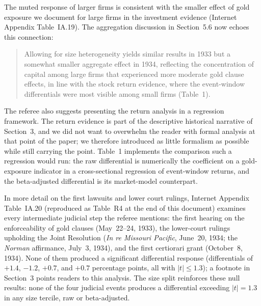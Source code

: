 \medskip
\noindent The muted response of larger firms is consistent with the smaller effect of gold exposure we document for large firms in the investment evidence (Internet Appendix Table~IA.19). The aggregation discussion in Section~5.6 now echoes this connection:

\begin{quote}
Allowing for size heterogeneity yields similar results in 1933 but a somewhat smaller aggregate effect in 1934, reflecting the concentration of capital among large firms that experienced more moderate gold clause effects, in line with the stock return evidence, where the event-window differentials were most visible among small firms (Table~1).
\end{quote}

\medskip
\noindent The referee also suggests presenting the return analysis in a regression framework. The return evidence is part of the descriptive historical narrative of Section~3, and we did not want to overwhelm the reader with formal analysis at that point of the paper; we therefore introduced as little formalism as possible while still carrying the point. Table~1 implements the comparison such a regression would run: the raw differential is numerically the coefficient on a gold-exposure indicator in a cross-sectional regression of event-window returns, and the beta-adjusted differential is its market-model counterpart.

\medskip
\noindent In more detail on the first lawsuits and lower court rulings, Internet Appendix Table~IA.20 (reproduced as Table~R4 at the end of this document) examines every intermediate judicial step the referee mentions: the first hearing on the enforceability of gold clauses (May~22--24, 1933), the lower-court rulings upholding the Joint Resolution (\textit{In re Missouri Pacific}, June~20, 1934; the \textit{Norman} affirmance, July~3, 1934), and the first certiorari grant (October~8, 1934). None of them produced a significant differential response (differentials of $+1.4$, $-1.2$, $+0.7$, and $+0.7$ percentage points, all with $|t| \le 1.3$); a footnote in Section~3 points readers to this analysis. The size split reinforces these null results: none of the four judicial events produces a differential exceeding $|t| = 1.3$ in any size tercile, raw or beta-adjusted.
